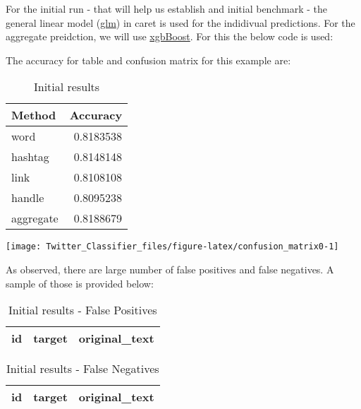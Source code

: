 \documentclass[11pt,]{article}
\begin{document}
For the initial run - that will help us establish and initial benchmark
- the general linear model (\href{}{glm}) in caret is used for the
indidivual predictions. For the aggregate preidction, we will use
\href{https://en.wikipedia.org/wiki/XGBoost}{xgbBoost}. For this the
below code is used:

The accuracy for table and confusion matrix for this example are:

\begin{table}[H]

\caption{\label{tab:fp_acc}Initial results}
\centering
\begin{tabular}[t]{lr}
\toprule
Method & Accuracy\\
\midrule
\rowcolor{gray!6}  word & 0.8183538\\
hashtag & 0.8148148\\
\rowcolor{gray!6}  link & 0.8108108\\
handle & 0.8095238\\
\rowcolor{gray!6}  aggregate & 0.8188679\\
\bottomrule
\end{tabular}
\end{table}

\begin{center}\texttt{[image: Twitter\_Classifier\_files/figure-latex/confusion\_matrix0-1]} \end{center}

As observed, there are large number of false positives and false
negatives. A sample of those is provided below:

\begin{table}[H]

\caption{\label{tab:result_1_FP}Initial results - False Positives}
\centering
\begin{tabular}[t]{rr>{\raggedright\arraybackslash}p{30em}}
\toprule
\rowcolor{gray!6}  id & target & original\_text\\


\bottomrule
\end{tabular}
\end{table}

\begin{table}[H]

\caption{\label{tab:result_1_FN}Initial results - False Negatives}
\centering
\begin{tabular}[t]{rr>{\raggedright\arraybackslash}p{30em}}
\toprule
\rowcolor{gray!6}  id & target & original\_text\\


\bottomrule
\end{tabular}
\end{table}
\end{document}
